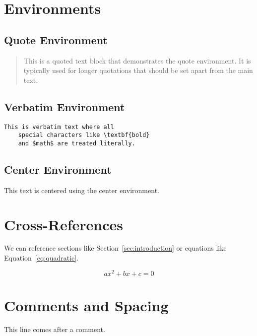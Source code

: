 \documentclass[12pt,a4paper]{article}
\begin{document}
\section{Environments}

\subsection{Quote Environment}

\begin{quote}
This is a quoted text block that demonstrates the quote environment. It is typically used for longer quotations that should be set apart from the main text.
\end{quote}

\subsection{Verbatim Environment}

\begin{verbatim}
This is verbatim text where all
    special characters like \textbf{bold}
    and $math$ are treated literally.
\end{verbatim}

\subsection{Center Environment}

\begin{center}
This text is centered using the center environment.
\end{center}

\section{Cross-References}

We can reference sections like Section~\ref{sec:introduction} or equations like Equation~\ref{eq:quadratic}.

\begin{equation}
\label{eq:quadratic}
ax^2 + bx + c = 0
\end{equation}

\section{Comments and Spacing}

This line comes after a comment.
\end{document}
